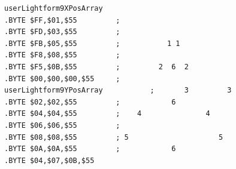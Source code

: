 \begin{minipage}[b]{0.48\linewidth}
\begin{lrbox}{\mybox}%
\begin{lstlisting}[basicstyle=\ttfamily\tiny,escapechar=\%]
userLightform9XPosArray
.BYTE $FF,$01,$55         ;                        
.BYTE $FD,$03,$55         ;                        
.BYTE $FB,$05,$55         ;           1 1          
.BYTE $F8,$08,$55         ;                        
.BYTE $F5,$0B,$55         ;         2  6  2        
.BYTE $00,$00,$00,$55     ;                        
userLightform9YPosArray           ;       3         3      
.BYTE $02,$02,$55         ;            6           
.BYTE $04,$04,$55         ;    4               4   
.BYTE $06,$06,$55         ;                        
.BYTE $08,$08,$55         ; 5                     5
.BYTE $0A,$0A,$55         ;            6           
.BYTE $04,$07,$0B,$55
\end{lstlisting}
\end{lrbox}%
\scalebox{0.8}{\usebox{\mybox}}

\end{minipage}
%
%
